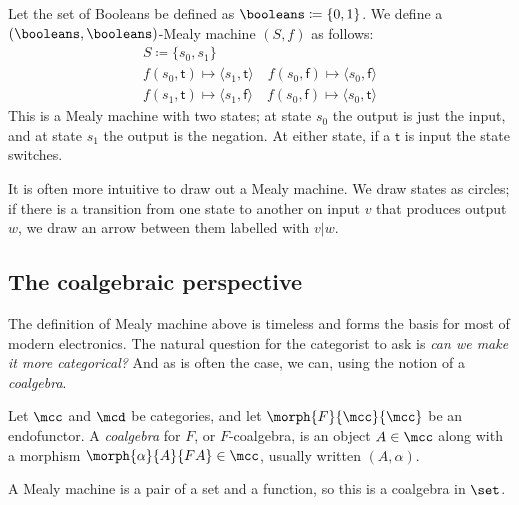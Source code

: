 \begin{example}
    Let the set of Booleans be defined as \(\booleans \coloneqq \{0,1\}\).
    We define a \((\booleans,\booleans)\)-Mealy machine \((S, f)\) as follows:
    \begin{gather*}
        S \coloneqq \{s_0, s_1\}
        \\
        f(s_0, \mathsf{t}) \mapsto \langle{s_1, \mathsf{t}}\rangle
        \quad
        f(s_0, \mathsf{f}) \mapsto \langle{s_0, \mathsf{f}}\rangle
        \\
        f(s_1, \mathsf{t}) \mapsto \langle{s_1, \mathsf{f}}\rangle
        \quad
        f(s_0, \mathsf{f}) \mapsto \langle{s_0, \mathsf{t}}\rangle
    \end{gather*}
    This is a Mealy machine with two states; at state \(s_0\) the output is just
    the input, and at state \(s_1\) the output is the negation.
    At either state, if a \(\mathsf{t}\) is input the state switches.

    It is often more intuitive to draw out a Mealy machine.
    We draw states as circles; if there is a transition from one state to
    another on input \(v\) that produces output \(w\), we draw an arrow between
    them labelled with \(v|w\).
    \begin{center}
        
    \end{center}
\end{example}

\subsection{The coalgebraic perspective}

The definition of Mealy machine above is timeless and forms the basis for most
of modern electronics.
The natural question for the categorist to ask is
\emph{can we make it more categorical?}
And as is often the case, we can, using the notion of a \emph{coalgebra}.

\begin{definition}[Coalgebra]
    Let \(\mcc\) and \(\mcd\) be categories, and let \(\morph{F}{\mcc}{\mcc}\)
    be an endofunctor.
    A \emph{coalgebra} for \(F\), or \(F\)-coalgebra, is an object
    \(A \in \mcc\) along with a morphism \(\morph{\alpha}{A}{FA} \in \mcc\),
    usually written \((A,\alpha)\).
\end{definition}

A Mealy machine is a pair of a set
and a function, so this is a coalgebra in \(\set\).

